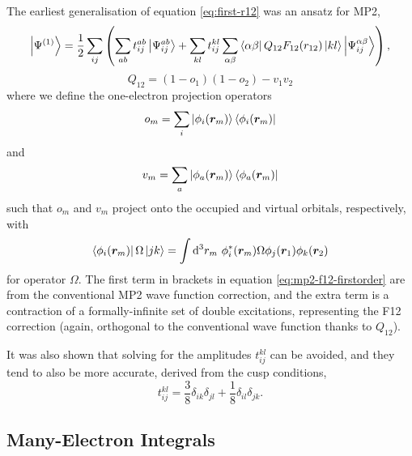 The earliest generalisation of equation \ref{eq:first-r12} was an ansatz for MP2,
\begin{equation}
    \label{eq:mp2-f12-firstorder}
    \ket{\Psi^{(1)}} = \frac 12\sum_{ij}\left( \sum_{ab}t_{ij}^{ab}\ket{\Psi_{ij}^{ab}} + \sum_{kl}t_{ij}^{kl}\sum_{\alpha\beta}\bra{\alpha\beta}Q_{12}F_{12}(r_{12})\ket{kl}\ket{\Psi_{ij}^{\alpha\beta}} \right),
\end{equation}
\begin{equation}
    \label{eq:mp2-f12-projector}
    Q_{12} = (1-o_1)(1-o_2) - v_1v_2
\end{equation}
where we define the one-electron projection operators
\begin{equation}
    o_m = \sum_i\ket{\phi_i(\bm r_m)}\bra{\phi_i(\bm r_m)}
\end{equation}
and
\begin{equation}
    v_m = \sum_a\ket{\phi_a(\bm r_m)}\bra{\phi_a(\bm r_m)}
\end{equation}
such that $o_m$ and $v_m$ project onto the occupied and virtual orbitals, respectively, with
\begin{equation}
    \bra{\phi_i(\bm r_m)}\Omega\ket{jk} = \int\mathrm{d}^3r_m\ \phi_i^*(\bm r_m)\Omega\phi_j(\bm r_1)\phi_k(\bm r_2)
\end{equation}
for operator $\Omega$. The first term in brackets in equation \ref{eq:mp2-f12-firstorder} are from the conventional MP2 wave function correction, and the extra term is a contraction of a formally-infinite set of double excitations, representing the F12 correction (again, orthogonal to the conventional wave function thanks to $Q_{12}$).

It was also shown that solving for the amplitudes $t_{ij}^{kl}$ can be avoided, and they tend to also be more accurate, derived from the cusp conditions,
\begin{equation}
    t_{ij}^{kl} = \frac 38\delta_{ik}\delta_{jl}+\frac 18\delta_{il}\delta_{jk}.
\end{equation}

\subsection{Many-Electron Integrals}

